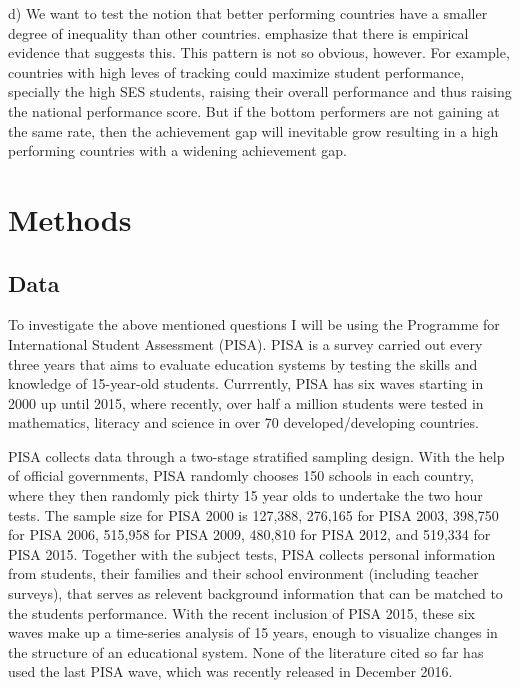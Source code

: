 \documentclass[11pt, a4paper]{article}\usepackage[]{graphicx}\usepackage[]{color}
\begin{document}
d) We want to test the notion that better performing countries have a smaller degree of inequality than other countries. \citet{werfhorst_mijs} emphasize that there is empirical evidence that suggests this. This pattern is not so obvious, however. For example, countries with high leves of tracking could maximize student performance, specially the high SES students, raising their overall performance and thus raising the national performance score. But if the bottom performers are not gaining at the same rate, then the achievement gap will inevitable grow resulting in a high performing countries with a widening achievement gap.


\section{Methods}

\subsection{Data}



To investigate the above mentioned questions I will be using the Programme for International Student Assessment (PISA). PISA is a survey carried out every three years that aims to evaluate education systems by testing the skills and knowledge of 15-year-old students. Currrently, PISA has six waves starting in 2000 up until 2015, where recently, over half a million students were tested in mathematics, literacy and science in over 70 developed/developing countries.

PISA collects data through a two-stage stratified sampling design. With the help of official governments, PISA randomly chooses 150 schools in each country, where they then randomly pick thirty 15 year olds to undertake the two hour tests. The sample size for PISA 2000 is 127,388, 276,165 for PISA 2003, 398,750 for PISA 2006, 515,958 for PISA 2009, 480,810 for PISA 2012, and 519,334 for PISA 2015. Together with the subject tests, PISA collects personal information from students, their families and their school environment (including teacher surveys), that serves as relevent background information that can be matched to the students performance. With the recent inclusion of PISA 2015, these six waves make up a time-series analysis of 15 years, enough to visualize changes in the structure of an educational system. None of the literature cited so far has used the last PISA wave, which was recently released in December 2016.
\end{document}
